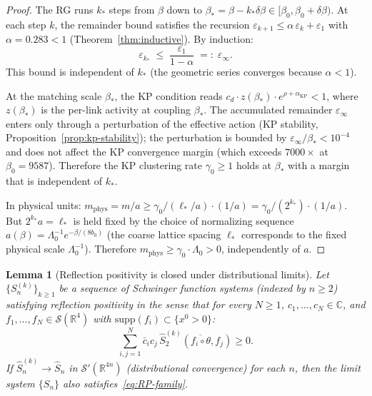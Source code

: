 \documentclass[11pt]{article}
\newtheorem{lemma}[theorem]{Lemma}
\theoremstyle{definition}
\newcommand{\R}{\mathbb{R}}
\begin{document}
\begin{proof}
The RG runs $k_*$ steps from $\beta$ down to
$\beta_*=\beta-k_*\delta\beta\in[\beta_0,\beta_0+\delta\beta)$.
At each step $k$, the remainder bound satisfies the recursion
$\varepsilon_{k+1}\le\alpha\,\varepsilon_k+\varepsilon_1$
with $\alpha=0.283<1$ (Theorem~\ref{thm:inductive}).
By induction:
\begin{equation}\label{eq:eps-accumulation}
\varepsilon_{k_*}\;\le\;
\frac{\varepsilon_1}{1-\alpha}\;=:\;\varepsilon_\infty.
\end{equation}
This bound is independent of $k_*$ (the geometric series
converges because $\alpha<1$).

At the matching scale $\beta_*$, the KP condition reads
$c_d\cdot z(\beta_*)\cdot e^{\rho+\alpha_{\mathrm{KP}}}<1$,
where $z(\beta_*)$ is the per-link activity at coupling
$\beta_*$.  The accumulated remainder
$\varepsilon_\infty$ enters only through a perturbation
of the effective action (KP stability,
Proposition~\ref{prop:kp-stability}); the perturbation is bounded
by $\varepsilon_\infty/\beta_*<10^{-4}$ and does not
affect the KP convergence margin
(which exceeds $7000\times$ at $\beta_0=9587$).
Therefore the KP clustering rate $\gamma_0\ge 1$ holds
at $\beta_*$ with a margin that is independent of $k_*$.

In physical units: $m_{\mathrm{phys}}=m/a
\ge\gamma_0/(\ell_*/a)\cdot(1/a)
=\gamma_0/(2^{k_*})\cdot(1/a)$.  But
$2^{k_*}a=\ell_*$ is held fixed by the choice of
normalizing sequence $a(\beta)=\Lambda_0^{-1}
e^{-\beta/(8b_0)}$ (the coarse lattice spacing $\ell_*$
corresponds to the fixed physical scale $\Lambda_0^{-1}$).
Therefore $m_{\mathrm{phys}}\ge\gamma_0\cdot\Lambda_0>0$,
independently of $a$.
\end{proof}

\begin{lemma}[Reflection positivity is closed under
distributional limits]\label{lem:RP-closed}
Let $\{S_n^{(k)}\}_{k\ge 1}$ be a sequence of
Schwinger function systems (indexed by $n\ge 2$) satisfying
reflection positivity in the sense that for every $N\ge 1$,
$c_1,\ldots,c_N\in\mathbb{C}$, and
$f_1,\ldots,f_N\in\mathcal{S}(\R^4)$ with
$\mathrm{supp}(f_i)\subset\{x^0>0\}$:
\begin{equation}\label{eq:RP-family}
\sum_{i,j=1}^N\bar c_i c_j\,
\hat S_2^{(k)}(\overline{f_i\circ\theta},f_j)\ge 0.
\end{equation}
If $\hat S_n^{(k)}\to\hat S_n$ in $\mathcal{S}'(\R^{4n})$
(distributional convergence) for each $n$, then the limit
system $\{S_n\}$ also satisfies~\eqref{eq:RP-family}.
\end{lemma}
\end{document}
